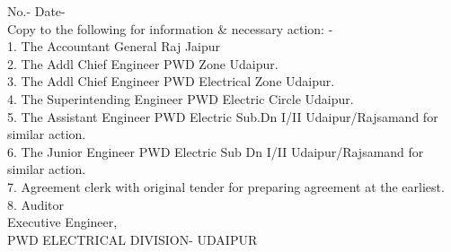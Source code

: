 \documentclass[a4paper]{article}
\begin{document}
No.- \hfill Date- \\
Copy to the following for information \& necessary action: - \\
1. The Accountant General Raj Jaipur \\
2. The Addl Chief Engineer PWD Zone Udaipur. \\
3. The Addl Chief Engineer PWD Electrical Zone Udaipur. \\
4. The Superintending Engineer PWD Electric Circle Udaipur. \\
5. The Assistant Engineer PWD Electric Sub.Dn I/II Udaipur/Rajsamand for similar action. \\
6. The Junior Engineer PWD Electric Sub Dn I/II Udaipur/Rajsamand for similar action. \\
7. Agreement clerk with original tender for preparing agreement at the earliest. \\
8. Auditor \\

Executive Engineer, \\
PWD ELECTRICAL DIVISION- UDAIPUR
\end{document}
